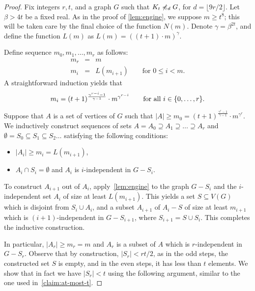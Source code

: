\begin{proof}
Fix integers $r,t$,  and a graph $G$ such that $K_t\not\preccurlyeq_{d} G$,
for $d=\lfloor 9r/2 \rfloor$. Let $\beta>4t$ be a fixed real. As in the proof of \cref{lem:engine}, we suppose $m\geq t^8$; this will be taken care by the final choice of the function $N(m)$.
Denote $\gamma=\beta^{2t}$, and
define the function $L(m)$ as $L(m)=((t+1)\cdot m)^\gamma$.

Define sequence $m_0,m_1,\ldots,m_r$ as follows:
\begin{eqnarray*}
m_r & = & m\\
m_i & = & L(m_{i+1}) \qquad \textrm{for }0\leq i<m.
\end{eqnarray*}
A straightforward induction yields that 
\begin{equation*}
m_i=(t+1)^{\frac{\gamma^{r-i}-1}{\gamma-1}}\cdot m^{\gamma^{r-i}}\qquad \textrm{for all }i\in \{0,\ldots,r\}.
\end{equation*}

Suppose that $A$ is a set of vertices of $G$ such that $|A|\ge m_0=(t+1)^{\frac{\gamma^{r}-1}{\gamma-1}}\cdot m^{\gamma^{r}}$. 
We inductively construct sequences of sets $A= A_0\supseteq A_1\supseteq \ldots \supseteq A_r$ and $\emptyset=S_0\subseteq S_1\subseteq S_2\ldots$
satisfying the following conditions:
\begin{itemize}
	\item $|A_i|\ge m_i=L(m_{i+1})$,
	\item $A_i\cap S_i=\emptyset$ and $A_i$ is $i$-independent in $G-S_i$.
\end{itemize}
To construct $A_{i+1}$ out of $A_i$, apply~\cref{lem:engine} to the graph $G-S_i$ and 
the $i$-independent set $A_i$ of size at least $L(m_{i+1})$. This yields a set $S\subseteq V(G)$ which is disjoint from $S_i\cup A_i$, and a subset $A_{i+1}$ of $A_i-S$ of size 
at least $m_{i+1}$
which is $(i+1)$-independent in $G-S_{i+1}$, where $S_{i+1}=S\cup S_i$. This completes the inductive construction.

In particular,  $|A_r|\ge m_r=m$ and $A_r$ is a subset of $A$ which is $r$-independent in $G-S_r$.
Observe that by construction, $|S_r|<r t/2$, as in the odd steps, the constructed set $S$ is empty, and in the even steps, it has less than $t$ elements. 
We show that in fact we have $|S_r|<t$ using the following argument, similar to the one used in~\cref{claim:at-most-t}.


\end{proof}

